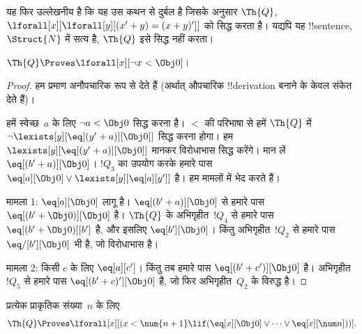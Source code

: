 \documentclass[../../../include/open-logic-section]{subfiles}
\begin{document}
यह फिर उल्लेखनीय है कि यह उस कथन से दुर्बल है जिसके अनुसार $\Th{Q}$,
$\lforall[x][\lforall[y][(x' + y) = (x + y)']]$ को सिद्ध करता है। यद्यपि
यह !!{sentence},~$\Struct{N}$ में सत्य है, $\Th{Q}$ इसे सिद्ध नहीं करता।

\begin{lem}
$\Th{Q} \Proves \lforall[x][\lnot x < \Obj 0]$।
\end{lem}

\begin{proof}
हम प्रमाण अनौपचारिक रूप से देते हैं (अर्थात् औपचारिक !!{derivation} बनाने
के केवल संकेत देते हैं)।

हमें स्वेच्छ~$a$ के लिए $\lnot a < \Obj 0$ सिद्ध करना है। $<$ की परिभाषा
से हमें $\Th{Q}$ में
$\lnot \lexists[y][\eq[(y'+a)][\Obj 0]]$ सिद्ध करना होगा। हम
$\lexists[y][\eq[(y'+a)][\Obj 0]]$ मानकर विरोधाभास सिद्ध करेंगे। मान लें
$\eq[(b'+a)][\Obj 0]$। $!Q_3$ का उपयोग करके हमारे पास
$\eq[a][\Obj 0] \lor \lexists[y][\eq[a][y']]$ है। हम मामलों में भेद करते
हैं।

मामला 1: $\eq[a][\Obj 0]$ लागू है। $\eq[(b'+a)][\Obj 0]$ से हमारे पास
$\eq[(b' + \Obj 0)][\Obj 0]$ है। $\Th{Q}$ के अभिगृहीत~$!Q_4$ से हमारे
पास $\eq[(b' + \Obj 0)][b']$ है, और इसलिए $\eq[b'][\Obj 0]$। किंतु
अभिगृहीत~$!Q_2$ से हमारे पास $\eq/[b'][\Obj 0]$ भी है, जो विरोधाभास है।

मामला 2: किसी $c$ के लिए $\eq[a][c']$। किंतु तब हमारे पास
$\eq[(b' + c')][\Obj 0]$ है। अभिगृहीत~$!Q_5$ से हमारे पास
$\eq[(b' + c)'][\Obj 0]$ है, जो फिर अभिगृहीत~$Q_2$ के विरुद्ध है।
\end{proof}

\begin{lem}
प्रत्येक प्राकृतिक संख्या~$n$ के लिए
  \[
  \Th{Q} \Proves
  \lforall[x][(x < \num {n+1} \lif (\eq[x][\Obj 0] \lor \dots \lor
    \eq[x][\num n]))].
  \]
\end{lem}
\end{document}
